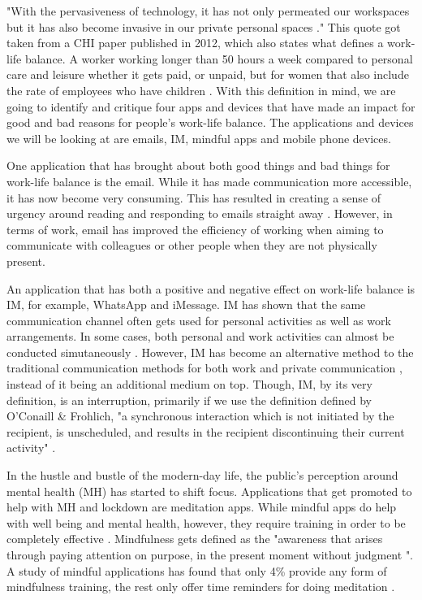 \documentclass{sigchi}
\begin{document}
	"With the pervasiveness of technology, it has not only permeated our workspaces but it has also become invasive in our private personal spaces \cite{peters2012sig}." This quote got taken from a CHI paper published in 2012, which also states what defines a work-life balance. A worker working longer than 50 hours a week compared to personal care and leisure whether it gets paid, or unpaid, but for women that also include the rate of employees who have children \cite{peters2012sig}. With this definition in mind, we are going to identify and critique four apps and devices that have made an impact for good and bad reasons for people's work-life balance. The applications and devices we will be looking at are emails, IM, mindful apps and mobile phone devices.
	
	One application that has brought about both good things and bad things for work-life balance is the email. While it has made communication more accessible, it has now become very consuming. This has resulted in creating a sense of urgency around reading and responding to emails straight away \cite{stawarz2013d}. However, in terms of work, email has improved the efficiency of working when aiming to communicate with colleagues or other people when they are not physically present.
	
	An application that has both a positive and negative effect on work-life balance is IM, for example, WhatsApp and iMessage. IM has shown that the same communication channel often gets used for personal activities as well as work arrangements. In some cases, both personal and work activities can almost be conducted simutaneously \cite{lindley2012s}. However, IM has become an alternative method to the traditional communication methods for both work \cite{siggroup2005group} and private communication \cite{flanagin2005online}, instead of it being an additional medium on top. Though, IM, by its very definition, is an interruption, primarily if we use the definition defined by O'Conaill \& Frohlich, "a synchronous interaction which is not initiated by the recipient, is unscheduled, and results in the recipient discontinuing their current activity" \cite{rennecker2003theorizing}.  
	
	In the hustle and bustle of the modern-day life, the public's perception around mental health (MH) has started to shift focus. Applications that get promoted to help with MH and lockdown are meditation apps. While mindful apps do help with well being and mental health, however, they require training in order to be completely effective \cite{dauden2018evaluating}. Mindfulness gets defined as the "awareness that arises through paying attention on purpose, in the present moment without judgment \cite{baer2003mindfulness}". A study of mindful applications has found that only 4\% provide any form of mindfulness training, the rest only offer time reminders for doing meditation \cite{mani2015review}. %
	
\end{document}
